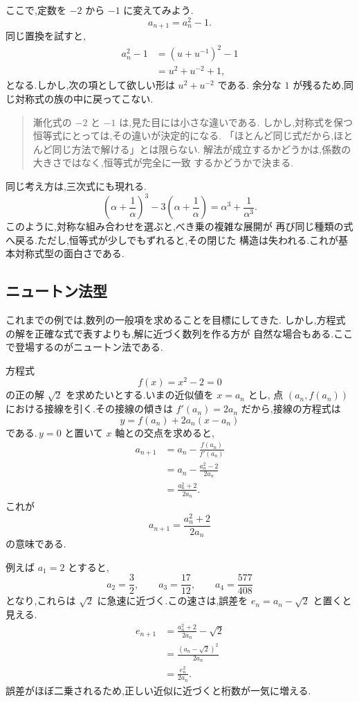 ここで,定数を $-2$ から $-1$ に変えてみよう.
\[
  a_{n+1}=a_n^2-1.
  \tag{2.7.11}
\]
同じ置換を試すと,
\begin{align*}
  a_n^2-1
    &=\left(u+u^{-1}\right)^2-1\\
    &=u^2+u^{-2}+1,
\end{align*}
となる.しかし,次の項として欲しい形は $u^2+u^{-2}$ である.
余分な $1$ が残るため,同じ対称式の族の中に戻ってこない.

\begin{quote}
漸化式の $-2$ と $-1$ は,見た目には小さな違いである.
しかし,対称式を保つ恒等式にとっては,その違いが決定的になる.
「ほとんど同じ式だから,ほとんど同じ方法で解ける」とは限らない.
解法が成立するかどうかは,係数の大きさではなく,恒等式が完全に一致
するかどうかで決まる.
\end{quote}

同じ考え方は,三次式にも現れる.
\[
  \left(\alpha+\frac{1}{\alpha}\right)^3
  -3\left(\alpha+\frac{1}{\alpha}\right)
  =\alpha^3+\frac{1}{\alpha^3}.
\]
このように,対称な組み合わせを選ぶと,べき乗の複雑な展開が
再び同じ種類の式へ戻る.ただし,恒等式が少しでもずれると,その閉じた
構造は失われる.これが基本対称式型の面白さである.

\subsection{ニュートン法型}

これまでの例では,数列の一般項を求めることを目標にしてきた.
しかし,方程式の解を正確な式で表すよりも,解に近づく数列を作る方が
自然な場合もある.ここで登場するのがニュートン法である.

方程式
\[
  f(x)=x^2-2=0
\]
の正の解 $\sqrt{2}$ を求めたいとする.いまの近似値を $x=a_n$ とし,
点 $(a_n,f(a_n))$ における接線を引く.その接線の傾きは
$f'(a_n)=2a_n$ だから,接線の方程式は
\[
  y=f(a_n)+2a_n(x-a_n)
\]
である.\,$y=0$ と置いて $x$ 軸との交点を求めると,
\begin{align*}
  a_{n+1}
    &=a_n-\frac{f(a_n)}{f'(a_n)}\\
    &=a_n-\frac{a_n^2-2}{2a_n}\\
    &=\frac{a_n^2+2}{2a_n}.
\end{align*}
これが
\[
  a_{n+1}=\frac{a_n^2+2}{2a_n}
  \tag{2.7.12}
\]
の意味である.

例えば $a_1=2$ とすると,
\[
  a_2=\frac{3}{2},
  \qquad
  a_3=\frac{17}{12},
  \qquad
  a_4=\frac{577}{408}
\]
となり,これらは $\sqrt{2}$ に急速に近づく.この速さは,誤差を
$e_n=a_n-\sqrt{2}$ と置くと見える.
\begin{align*}
  e_{n+1}
    &=\frac{a_n^2+2}{2a_n}-\sqrt{2}\\
    &=\frac{(a_n-\sqrt{2})^2}{2a_n}\\
    &=\frac{e_n^2}{2a_n}.
\end{align*}
誤差がほぼ二乗されるため,正しい近似に近づくと桁数が一気に増える.

